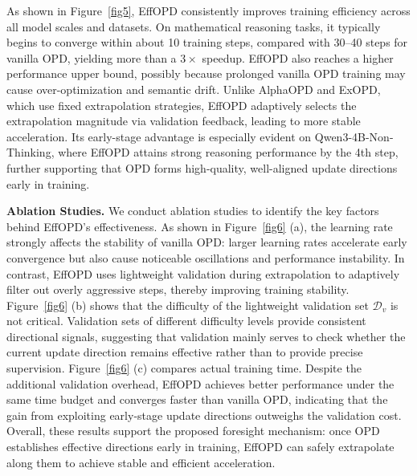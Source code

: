 \documentclass{llmxive}
\begin{document}
As shown in Figure~\ref{fig5}, EffOPD consistently improves training efficiency across all model scales and datasets. On mathematical reasoning tasks, it typically begins to converge within about 10 training steps, compared with 30--40 steps for vanilla OPD, yielding more than a $3\times$ speedup. EffOPD also reaches a higher performance upper bound, possibly because prolonged vanilla OPD training may cause over-optimization and semantic drift. Unlike AlphaOPD and ExOPD, which use fixed extrapolation strategies, EffOPD adaptively selects the extrapolation magnitude via validation feedback, leading to more stable acceleration. Its early-stage advantage is especially evident on Qwen3-4B-Non-Thinking, where EffOPD attains strong reasoning performance by the 4th step, further supporting that OPD forms high-quality, well-aligned update directions early in training.

\textbf{Ablation Studies.}
We conduct ablation studies to identify the key factors behind EffOPD's effectiveness. As shown in Figure~\ref{fig6} (a), the learning rate strongly affects the stability of vanilla OPD: larger learning rates accelerate early convergence but also cause noticeable oscillations and performance instability. In contrast, EffOPD uses lightweight validation during extrapolation to adaptively filter out overly aggressive steps, thereby improving training stability. Figure~\ref{fig6} (b) shows that the difficulty of the lightweight validation set $\mathcal{D}_v$ is not critical. Validation sets of different difficulty levels provide consistent directional signals, suggesting that validation mainly serves to check whether the current update direction remains effective rather than to provide precise supervision. Figure~\ref{fig6} (c) compares actual training time. Despite the additional validation overhead, EffOPD achieves better performance under the same time budget and converges faster than vanilla OPD, indicating that the gain from exploiting early-stage update directions outweighs the validation cost. Overall, these results support the proposed foresight mechanism: once OPD establishes effective directions early in training, EffOPD can safely extrapolate along them to achieve stable and efficient acceleration.
\end{document}
